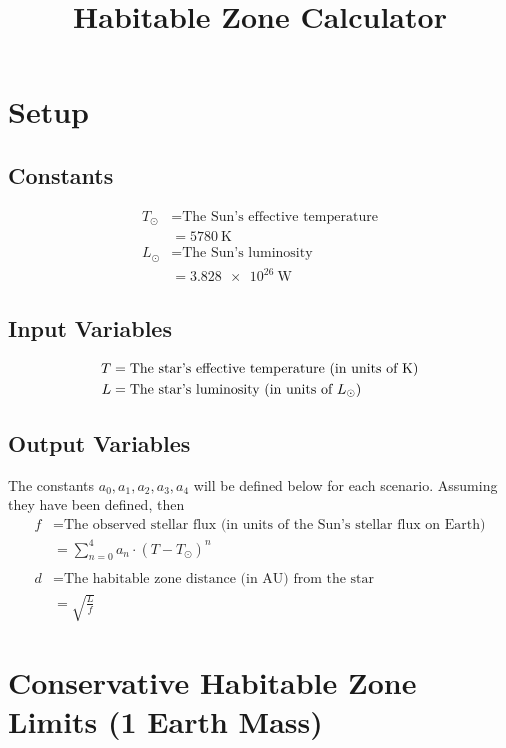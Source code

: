 \documentclass{article}
\title{Habitable Zone Calculator}
\date{}
\newcommand{\tsun}{T_\odot}
\newcommand{\lsun}{L_\odot}
\begin{document}
\maketitle

\section{Setup}
\subsection{Constants}
\begin{align*}
	\tsun & =\textrm{The Sun's effective temperature} \\
	      & =\SI{5780}{\kelvin}                       \\
	\lsun & =\textrm{The Sun's luminosity}            \\
	      & =\SI{3.828e26}{\watt}
\end{align*}
\subsection{Input Variables}
\begin{align*}
	T & =\textrm{The star's effective temperature (in units of K)} \\
	L & =\textrm{The star's luminosity (in units of \( \lsun \))}
\end{align*}
\subsection{Output Variables}
The constants \(a_0, a_1, a_2, a_3, a_4\) will be defined below for each scenario. Assuming they have been defined, then
\begin{align*}
	f & =\textrm{The observed stellar flux (in units of the Sun's stellar flux on Earth)} \\
	  & =\sum_{n=0}^4 a_n\cdot{(T-\tsun)}^{n}                                             \\
	\\
	d & =\textrm{The habitable zone distance (in AU) from the star}                       \\
	  & =\sqrt{\frac{L}{f}}
\end{align*}

\section{Conservative Habitable Zone Limits (1 Earth Mass)}
\end{document}
